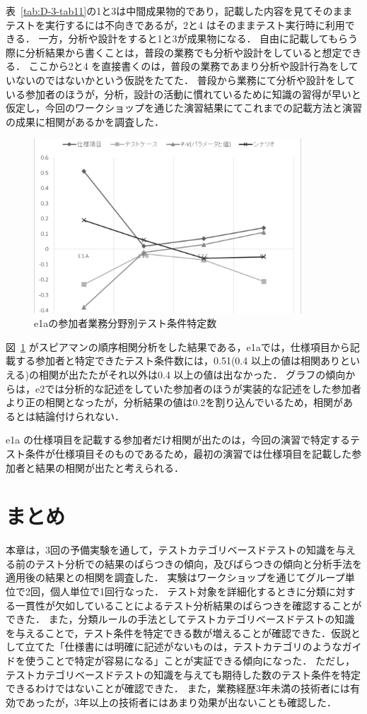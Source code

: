 表~\ref{tab:D-3-tab11}の1と3は中間成果物的であり，記載した内容を見てそのままテストを実行するには不向きであるが，2と4 はそのままテスト実行時に利用できる．
一方，分析や設計をすると1と3が成果物になる．
自由に記載してもらう際に分析結果から書くことは，普段の業務でも分析や設計をしていると想定できる．
ここから2と4 を直接書くのは，普段の業務であまり分析や設計行為をしていないのではないかという仮説をたてた．
普段から業務にて分析や設計をしている参加者のほうが，分析，設計の活動に慣れているために知識の習得が早いと仮定し，今回のワークショップを通じた演習結果にてこれまでの記載方法と演習の成果に相関があるかを調査した．

\begin{figure}[h]
  \begin{center}
  \includegraphics[width=10cm]{./image/D-3-Fig13.png}
  \caption{e1aの参加者業務分野別テスト条件特定数}
  \label{fig:D-3-Fig13}
  \end{center}
\end{figure}

図~\ref{fig:D-3-Fig13} がスピアマンの順序相関分析をした結果である，e1aでは，仕様項目から記載する参加者と特定できたテスト条件数には，0.51(0.4 以上の値は相関ありといえる)の相関が出たたがそれ以外は0.4 以上の値は出なかった．
グラフの傾向からは，e2では分析的な記述をしていた参加者のほうが実装的な記述をした参加者より正の相関となったが，分析結果の値は0.2を割り込んでいるため，相関があるとは結論付けられない．

e1a の仕様項目を記載する参加者だけ相関が出たのは，今回の演習で特定するテスト条件が仕様項目そのものであるため，最初の演習では仕様項目を記載した参加者と結果の相関が出たと考えられる．

\newpage
\section{まとめ}
本章は，3回の予備実験を通して，テストカテゴリベースドテストの知識を与える前のテスト分析での結果のばらつきの傾向，及びばらつきの傾向と分析手法を適用後の結果との相関を調査した．
実験はワークショップを通じてグループ単位で2回，個人単位で1回行なった．
テスト対象を詳細化するときに分類に対する一貫性が欠如していることによるテスト分析結果のばらつきを確認することができた．
また，分類ルールの手法としてテストカテゴリベースドテストの知識を与えることで，テスト条件を特定できる数が増えることが確認できた．仮説として立てた「仕様書には明確に記述がないものは，テストカテゴリのようなガイドを使うことで特定が容易になる」ことが実証できる傾向になった．
ただし，テストカテゴリベースドテストの知識を与えても期待した数のテスト条件を特定できるわけではないことが確認できた．
また，業務経歴3年未満の技術者には有効であったが，3年以上の技術者にはあまり効果が出ないことも確認した．
